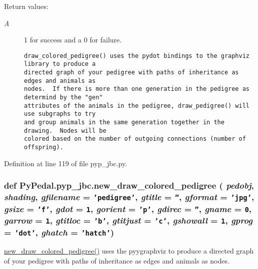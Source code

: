 \begin{Desc}
\item[Return values:]
\begin{description}
\item[{\em A}]1 for success and a 0 for failure.

\footnotesize\begin{verbatim}draw_colored_pedigree() uses the pydot bindings to the graphviz library to produce a
directed graph of your pedigree with paths of inheritance as edges and animals as
nodes.  If there is more than one generation in the pedigree as determind by the "gen"
attributes of the animals in the pedigree, draw_pedigree() will use subgraphs to try
and group animals in the same generation together in the drawing.  Nodes will be
colored based on the number of outgoing connections (number of offspring).
\end{verbatim}
\normalsize
 \end{description}
\end{Desc}


Definition at line 119 of file pyp\_\-jbc.py.\hypertarget{namespacePyPedal_1_1pyp__jbc_3b775faed2b4c51293a105869000d32e}{
\subsubsection[new\_\-draw\_\-colored\_\-pedigree]{\setlength{\rightskip}{0pt plus 5cm}def Py\-Pedal.pyp\_\-jbc.new\_\-draw\_\-colored\_\-pedigree ( {\em pedobj},  {\em shading},  {\em gfilename} = {\tt 'pedigree'},  {\em gtitle} = {\tt ''},  {\em gformat} = {\tt 'jpg'},  {\em gsize} = {\tt 'f'},  {\em gdot} = {\tt 1},  {\em gorient} = {\tt 'p'},  {\em gdirec} = {\tt ''},  {\em gname} = {\tt 0},  {\em garrow} = {\tt 1},  {\em gtitloc} = {\tt 'b'},  {\em gtitjust} = {\tt 'c'},  {\em gshowall} = {\tt 1},  {\em gprog} = {\tt 'dot'},  {\em ghatch} = {\tt 'hatch'})}}
\label{namespacePyPedal_1_1pyp__jbc_3b775faed2b4c51293a105869000d32e}


\hyperlink{namespacePyPedal_1_1pyp__jbc_3b775faed2b4c51293a105869000d32e}{new\_\-draw\_\-colored\_\-pedigree()} uses the pyygraphviz to produce a directed graph of your pedigree with paths of inheritance as edges and animals as nodes. 

